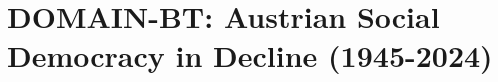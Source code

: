 %
%
%

\section{DOMAIN-BT: Austrian Social Democracy in Decline (1945-2024)}
\label{app:domain-austria-spo}

%
%
%
%
%

